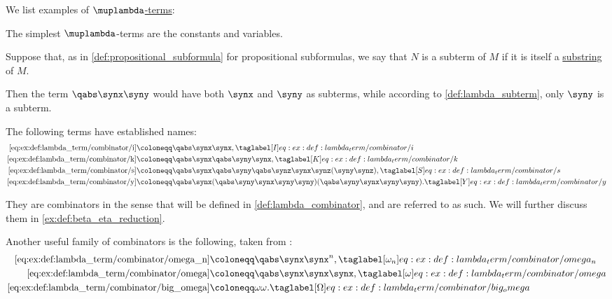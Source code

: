 \begin{example}\label{ex:def:lambda_term}
  We list examples of \hyperref[def:lambda_term]{\( \muplambda \)-terms}:
  \begin{thmenum}
     The simplest \( \muplambda \)-terms are the constants and variables.

     Suppose that, as in \cref{def:propositional_subformula} for propositional subformulas, we say that \( N \) is a subterm of \( M \) if it is itself a \hyperref[def:formal_language/substring]{substring} of \( M \).

    Then the term \( \qabs \synx \syny \) would have both \( \synx \) and \( \syny \) as subterms, while according to \cref{def:lambda_subterm}, only \( \syny \) is a subterm.

     The following terms have established names:
    \begin{align*}
      \ref{eq:ex:def:lambda_term/combinator/i} &\coloneqq \qabs \synx \synx,                                                           \taglabel[\ensuremath{I}]{eq:ex:def:lambda_term/combinator/i} \\
      \ref{eq:ex:def:lambda_term/combinator/k} &\coloneqq \qabs \synx \qabs \syny \synx,                                               \taglabel[\ensuremath{K}]{eq:ex:def:lambda_term/combinator/k} \\
      \ref{eq:ex:def:lambda_term/combinator/s} &\coloneqq \qabs \synx \qabs \syny \qabs \synz \synx \synz (\syny \synz),               \taglabel[\ensuremath{S}]{eq:ex:def:lambda_term/combinator/s} \\
      \ref{eq:ex:def:lambda_term/combinator/y} &\coloneqq \qabs \synx (\qabs \syny \synx \syny \syny) (\qabs \syny \synx \syny \syny). \taglabel[\ensuremath{Y}]{eq:ex:def:lambda_term/combinator/y}
    \end{align*}

    They are combinators in the sense that will be defined in \cref{def:lambda_combinator}, and are referred to as such. We will further discuss them in \cref{ex:def:beta_eta_reduction}.

    Another useful family of combinators is the following, taken from \cite[\S 3.1.21; \S 6.2.1]{Barendregt1984LambdaCalculus}:
    \begin{align*}
      \ref{eq:ex:def:lambda_term/combinator/omega_n}   &\coloneqq \qabs \synx \synx^n,     \taglabel[\ensuremath{ \omega_n }]{eq:ex:def:lambda_term/combinator/omega_n} \\
      \ref{eq:ex:def:lambda_term/combinator/omega}     &\coloneqq \qabs \synx \synx \synx, \taglabel[\ensuremath{ \omega }]{eq:ex:def:lambda_term/combinator/omega} \\
      \ref{eq:ex:def:lambda_term/combinator/big_omega} &\coloneqq \omega \omega.           \taglabel[\ensuremath{ \Omega }]{eq:ex:def:lambda_term/combinator/big_omega}
    \end{align*}
  \end{thmenum}
\end{example}

